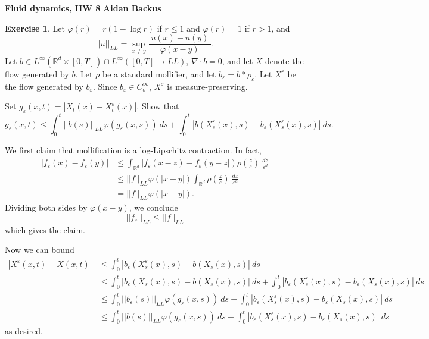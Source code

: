 \documentclass[10pt]{article}
\newcommand{\RR}{\mathbb{R}}
\renewcommand{\epsilon}{\varepsilon}
\theoremstyle{definition}
\newtheorem{exer}{Exercise}
\begin{document}
\noindent
\large\textbf{Fluid dynamics, HW 8} \hfill \textbf{Aidan Backus} \\

\begin{exer}
Let $\varphi(r) = r(1 - \log r)$ if $r \leq 1$ and $\varphi(r) = 1$ if $r > 1$, and
$$||u||_{LL} = \sup_{x \neq y} \frac{|u(x) - u(y)|}{\varphi(x - y)}.$$
Let $b \in L^\infty(\RR^d \times [0, T]) \cap L^\infty([0, T] \to LL)$, $\nabla \cdot b = 0$, and let $X$ denote the flow generated by $b$.
Let $\rho$ be a standard mollifier, and let $b_\varepsilon = b * \rho_\varepsilon$.
Let $X^\varepsilon$ be the flow generated by $b_\varepsilon$.
Since $b_\varepsilon \in C^\infty_\sigma$, $X^\varepsilon$ is measure-preserving.

Set $g_\varepsilon(x, t) = |X_t(x) - X^\varepsilon_t(x)|$. Show that
\begin{equation}
\label{first bound}
g_\varepsilon(x, t) \leq \int_0^t ||b(s)||_{LL}\varphi(g_\varepsilon(x, s)) ~ds + \int_0^t |b(X^\varepsilon_s(x), s) - b_\varepsilon(X^\varepsilon_s(x), s)| ~ds.
\end{equation}
\end{exer}

We first claim that mollification is a log-Lipschitz contraction. In fact,
\begin{align*}
|f_\epsilon(x) - f_\epsilon(y)| &\leq \int_{\RR^d} |f_\epsilon(x - z) - f_\epsilon(y - z|)\rho\left(\frac{z}{\epsilon}\right) ~\frac{dz}{\varepsilon^d}\\
&\leq ||f||_{LL} \varphi(|x - y|) \int_{\RR^d} \rho\left(\frac{z}{\epsilon}\right) ~\frac{dz}{\varepsilon^d}\\
&= ||f||_{LL} \varphi(|x - y|).
\end{align*}
Dividing both sides by $\varphi(x - y)$, we conclude
$$||f_\epsilon||_{LL} \leq ||f||_{LL}$$
which gives the claim.

Now we can bound
\begin{align*}
|X^\epsilon(x, t) - X(x, t)| &\leq \int_0^t |b_\epsilon(X^\epsilon_s(x), s) - b(X_s(x), s)| ~ds\\
&\leq \int_0^t |b_\epsilon(X_s(x), s) - b(X_s(x), s)| ~ds + \int_0^t |b_\epsilon(X^\epsilon_s(x), s) - b_\epsilon(X_s(x), s)| ~ds\\
&\leq \int_0^t ||b_\epsilon(s)||_{LL} \varphi(g_\epsilon(x, s)) ~ds + \int_0^t |b_\epsilon(X^\epsilon_s(x), s) - b_\epsilon(X_s(x), s)| ~ds\\
&\leq \int_0^t ||b(s)||_{LL} \varphi(g_\epsilon(x, s)) ~ds + \int_0^t |b_\epsilon(X^\epsilon_s(x), s) - b_\epsilon(X_s(x), s)| ~ds
\end{align*}
as desired.
\end{document}
